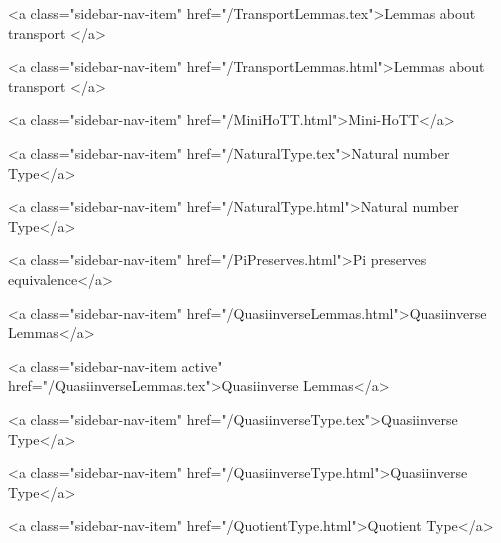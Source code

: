       
        
          <a class="sidebar-nav-item" href="/TransportLemmas.tex">Lemmas about transport </a>
        
      
    
      
        
          <a class="sidebar-nav-item" href="/TransportLemmas.html">Lemmas about transport </a>
        
      
    
      
        
          <a class="sidebar-nav-item" href="/MiniHoTT.html">Mini-HoTT</a>
        
      
    
      
        
          <a class="sidebar-nav-item" href="/NaturalType.tex">Natural number Type</a>
        
      
    
      
        
          <a class="sidebar-nav-item" href="/NaturalType.html">Natural number Type</a>
        
      
    
      
        
          <a class="sidebar-nav-item" href="/PiPreserves.html">Pi preserves equivalence</a>
        
      
    
      
        
          <a class="sidebar-nav-item" href="/QuasiinverseLemmas.html">Quasiinverse Lemmas</a>
        
      
    
      
        
          <a class="sidebar-nav-item active" href="/QuasiinverseLemmas.tex">Quasiinverse Lemmas</a>
        
      
    
      
        
          <a class="sidebar-nav-item" href="/QuasiinverseType.tex">Quasiinverse Type</a>
        
      
    
      
        
          <a class="sidebar-nav-item" href="/QuasiinverseType.html">Quasiinverse Type</a>
        
      
    
      
        
          <a class="sidebar-nav-item" href="/QuotientType.html">Quotient Type</a>
        
